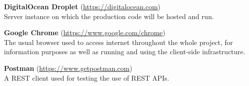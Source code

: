 \begin{addmargin}[1em]{0em}
\textbf{DigitalOcean Droplet} (\url{https://digitalocean.com})\\
Server instance on which the production code will be hosted and run.

\textbf{Google Chrome} (\url{https://www.google.com/chrome})\\
The usual browser used to access internet throughout the whole project, for information purposes as well as running and using the client-side infrastructure.

\textbf{Postman} (\url{https://www.getpostman.com})\\
A REST client used for testing the use of REST APIs.
\end{addmargin}
